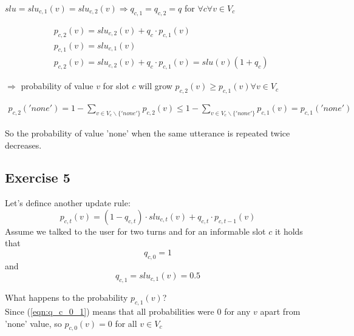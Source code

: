 \documentclass[12pt,titlepage,a4paper]{article}
\begin{document}
$slu = slu_{c, 1}(v) = slu_{c,2}(v) \Rightarrow q_{c,1} = q_{c, 2} = q$ for $\forall c \forall v \in V_c $

\begin{equation}
    \begin{aligned}
        &p_{c,2}(v) = slu_{c,2}(v) + q_c \cdot p_{c, 1}(v) 
        \\
        &p_{c,1}(v) = slu_{c,1}(v)
        \\
        &p_{c, 2}(v) = slu_{c,2}(v) + q_c \cdot p_{c, 1}(v) = slu(v)(1 + q_c)
    \end{aligned}
\end{equation}

$\Rightarrow$ probability of value $v$  for slot $c$ will grow $p_{c,2}(v) \geq p_{c,1}(v) \forall v \in V_c $

\begin{equation}
    \begin{aligned}
        p_{c,2}('none') = 1 - \sum_{v \in V_{c} \backslash \{'none'\}} p_{c,2}(v) \leq 1 - \sum_{v \in V_{c} \backslash \{'none'\}} p_{c,1}(v)  = p_{c,1}('none')
    \end{aligned}
\end{equation}

So the probability of value 'none' when the same utterance is repeated twice decreases.

\subsection{Exercise 5}
Let's defince another update rule:
\begin{equation}
    p_{c,t}(v) = (1-q_{c,t})\cdot slu_{c,t}(v) + q_{c,t} \cdot p_{c,t-1}(v)
\end{equation}
Assume we talked to the user for two turns and for an informable slot $c$ it holds that 
\begin{equation}
    \label{eqn:q_c_0_1}
    q_{c, 0} = 1
\end{equation}
and 
\begin{equation}
    \label{eqn:q_c_1}
    q_{c, 1} = slu_{c,1}(v) = 0.5
\end{equation}

\noindent What happens to the probability $p_{c,1}(v)$?\\

\noindent Since (\ref{eqn:q_c_0_1}) means that all probabilities were 0 for any $v$ apart from 'none' value, so $p_{c,0}(v) = 0$ for all $v \in V_c$ \\
\end{document}

